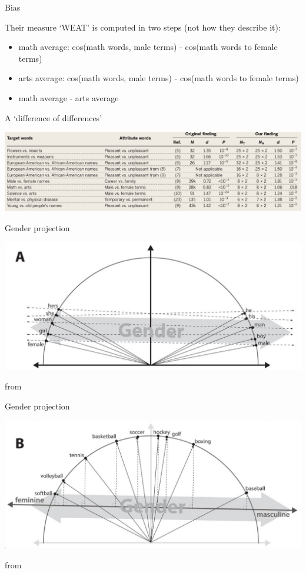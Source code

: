 \documentclass{hertieteaching}
\begin{document}
\begin{frame}[fragile]{Bias}

Their measure `WEAT' is computed in two steps (not how they describe it):
\begin{itemize}
  \item math average: cos(math words, male terms) - cos(math words to female terms)
  \item arts average: cos(math words, male terms) - cos(math words to female terms)
  \item math average - arts average
\end{itemize}
A `difference of differences'

\pause 

\medskip
\centerline{\includegraphics[scale = 0.3]{pictures/caliskan}}


\end{frame}


\begin{frame}[fragile]{Gender projection}

\centerline{\includegraphics[scale = 0.5]{pictures/gender2}}

from \textcite{Kozlowski.etal2019}

\end{frame}
\begin{frame}[fragile]{Gender projection}

\centerline{\includegraphics[scale = 0.5]{pictures/gender1}}

from \textcite{Kozlowski.etal2019}

\end{frame}
\end{document}
